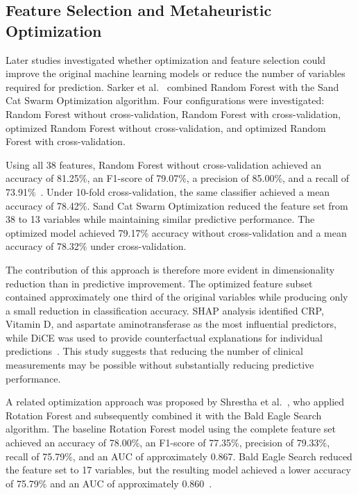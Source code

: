 \subsection{Feature Selection and Metaheuristic Optimization}

Later studies investigated whether optimization and feature selection could improve the original machine learning models or reduce the number of variables required for prediction. Sarker et al.~\cite{sarker2025gallstone} combined Random Forest with the Sand Cat Swarm Optimization algorithm. Four configurations were investigated: Random Forest without cross-validation, Random Forest with cross-validation, optimized Random Forest without cross-validation, and optimized Random Forest with cross-validation.

Using all 38 features, Random Forest without cross-validation achieved an accuracy of 81.25\%, an F1-score of 79.07\%, a precision of 85.00\%, and a recall of 73.91\%~\cite{sarker2025gallstone}. Under 10-fold cross-validation, the same classifier achieved a mean accuracy of 78.42\%. Sand Cat Swarm Optimization reduced the feature set from 38 to 13 variables while maintaining similar predictive performance. The optimized model achieved 79.17\% accuracy without cross-validation and a mean accuracy of 78.32\% under cross-validation.

The contribution of this approach is therefore more evident in dimensionality reduction than in predictive improvement. The optimized feature subset contained approximately one third of the original variables while producing only a small reduction in classification accuracy. SHAP analysis identified CRP, Vitamin D, and aspartate aminotransferase as the most influential predictors, while DiCE was used to provide counterfactual explanations for individual predictions~\cite{sarker2025gallstone}. This study suggests that reducing the number of clinical measurements may be possible without substantially reducing predictive performance.

A related optimization approach was proposed by Shrestha et al.~\cite{shrestha2026metaheuristic}, who applied Rotation Forest and subsequently combined it with the Bald Eagle Search algorithm. The baseline Rotation Forest model using the complete feature set achieved an accuracy of 78.00\%, an F1-score of 77.35\%, precision of 79.33\%, recall of 75.79\%, and an AUC of approximately 0.867. Bald Eagle Search reduced the feature set to 17 variables, but the resulting model achieved a lower accuracy of 75.79\% and an AUC of approximately 0.860~\cite{shrestha2026metaheuristic}.

